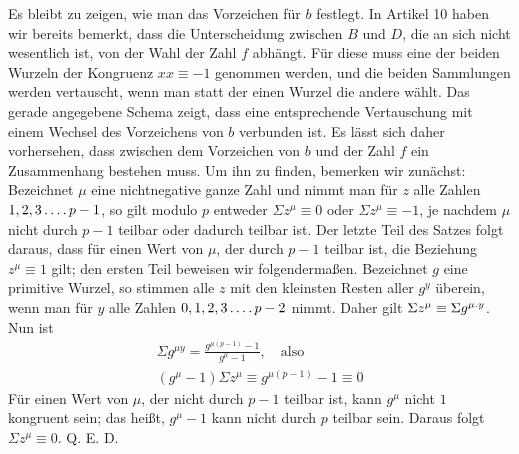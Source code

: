 \begingroup{}\relax
Es bleibt zu zeigen, wie man das Vorzeichen für $b$ festlegt. In Artikel 10 haben wir bereits bemerkt, dass die Unterscheidung zwischen $B$ und $D$, die an sich nicht wesentlich ist, von der Wahl der Zahl $f$ abhängt. Für diese muss eine der beiden Wurzeln der Kongruenz $xx\equiv-1$ genommen werden, und die beiden Sammlungen werden vertauscht, wenn man statt der einen Wurzel die andere wählt. Das gerade angegebene Schema zeigt, dass eine entsprechende Vertauschung mit einem Wechsel des Vorzeichens von $b$ verbunden ist. Es lässt sich daher vorhersehen, dass zwischen dem Vorzeichen von $b$ und der Zahl $f$ ein Zusammenhang bestehen muss. Um ihn zu finden, bemerken wir zunächst: Bezeichnet $\mu$ eine nichtnegative ganze Zahl und nimmt man für $z$ alle Zahlen $1,2,3\mathinner{.\,.\,.\,.} p-1$, so gilt modulo $p$ entweder $\Sigma z^\mu\equiv0$ oder $\Sigma z^\mu\equiv-1$, je nachdem $\mu$ nicht durch $p-1$ teilbar oder dadurch teilbar ist. Der letzte Teil des Satzes folgt daraus, dass für einen Wert von $\mu$, der durch $p-1$ teilbar ist, die Beziehung $z^\mu\equiv1$ gilt; den ersten Teil beweisen wir folgendermaßen. Bezeichnet $g$ eine primitive Wurzel, so stimmen alle $z$ mit den kleinsten Resten aller $g^y$ überein, wenn man für $y$ alle Zahlen $0,1,2,3\mathinner{.\,.\,.\,.} p-2$ nimmt. Daher gilt $\Sigma z^\mu\equiv\Sigma g^{\mu\mathbin{.} y}$. Nun ist
\[
\begin{gathered}
\Sigma g^{\mu y}=\frac{g^{\mu(p-1)}-1}{g^\mu-1},\quad\text{also}\\
(g^\mu-1)\Sigma z^\mu\equiv g^{\mu(p-1)}-1\equiv0
\end{gathered}
\]
Für einen Wert von $\mu$, der nicht durch $p-1$ teilbar ist, kann $g^\mu$ nicht $1$ kongruent sein; das heißt, $g^\mu-1$ kann nicht durch $p$ teilbar sein. Daraus folgt $\Sigma z^\mu\equiv0$. Q. E. D.\par\endgroup

